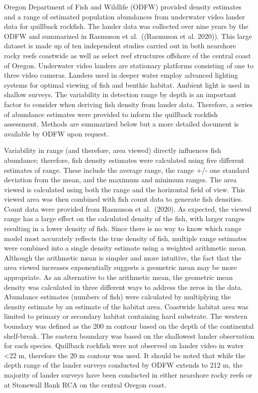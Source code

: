 \documentclass[11pt,
  english,
  a4paper,
]{article}
\begin{document}
Oregon Department of Fish and Wildlife (ODFW) provided density estimates and a range of estimated population abundances from underwater video lander data for quillback rockfish. The lander data was collected over nine years by the ODFW and summarized in Rasmuson et al.~({(Rasmuson et al. 2020)\leavevmode\tagmcend\tagstructend}). This large dataset is made up of ten independent studies carried out in both nearshore rocky reefs coastwide as well as select reef structures offshore of the central coast of Oregon. Underwater video landers are stationary platforms consisting of one to three video cameras. Landers used in deeper water employ advanced lighting systems for optimal viewing of fish and benthic habitat. Ambient light is used in shallow surveys. The variability in detection range by depth is an important factor to consider when deriving fish density from lander data. Therefore, a series of abundance estimates were provided to inform the quillback rockfish assessment. Methods are summarized below but a more detailed document is available by ODFW upon request.

\leavevmode\tagmcend\tagstructend\par


Variability in range (and therefore, area viewed) directly influences fish abundance; therefore, fish density estimates were calculated using five different estimates of range. These include the average range, the range +/- one standard deviation from the mean, and the maximum and minimum ranges. The area viewed is calculated using both the range and the horizontal field of view. This viewed area was then combined with fish count data to generate fish densities. Count data were provided from Rasmuson et al.~(2020). As expected, the viewed range has a large effect on the calculated density of the fish, with larger ranges resulting in a lower density of fish. Since there is no way to know which range model most accurately reflects the true density of fish, multiple range estimates were combined into a single density estimate using a weighted arithmetic mean. Although the arithmetic mean is simpler and more intuitive, the fact that the area viewed increases exponentially suggests a geometric mean may be more appropriate. As an alternative to the arithmetic mean, the geometric mean density was calculated in three different ways to address the zeros in the data. Abundance estimates (numbers of fish) were calculated by multiplying the density estimate by an estimate of the habitat area. Coastwide habitat area was limited to primary or secondary habitat containing hard substrate. The western boundary was defined as the 200 m contour based on the depth of the continental shelf-break. The eastern boundary was based on the shallowest lander observation for each species. Quillback rockfish were not observed on lander video in water \textless22 m, therefore the 20 m contour was used. It should be noted that while the depth range of the lander surveys conducted by ODFW extends to 212 m, the majority of lander surveys have been conducted in either nearshore rocky reefs or at Stonewall Bank RCA on the central Oregon coast.
\end{document}
